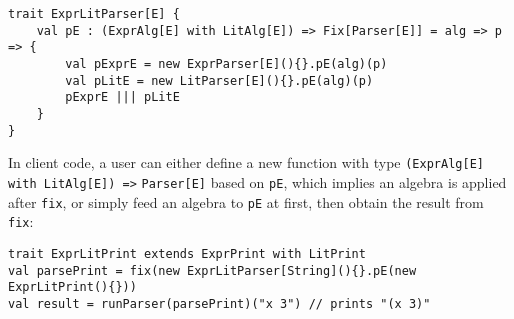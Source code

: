 \begin{lstlisting}
trait ExprLitParser[E] {
    val pE : (ExprAlg[E] with LitAlg[E]) => Fix[Parser[E]] = alg => p => {
        val pExprE = new ExprParser[E](){}.pE(alg)(p)
        val pLitE = new LitParser[E](){}.pE(alg)(p)
        pExprE ||| pLitE
    }
}
\end{lstlisting}


In client code, a user can either define a new function with type \lstinline{(ExprAlg[E] with LitAlg[E]) =>} \lstinline{Parser[E]} based on \lstinline{pE}, which implies an algebra is applied after \lstinline{fix}, or simply feed an algebra to \lstinline{pE} at first, then obtain the result from \lstinline{fix}:
\begin{lstlisting}
trait ExprLitPrint extends ExprPrint with LitPrint
val parsePrint = fix(new ExprLitParser[String](){}.pE(new ExprLitPrint(){}))
val result = runParser(parsePrint)("x 3") // prints "(x 3)"
\end{lstlisting}
